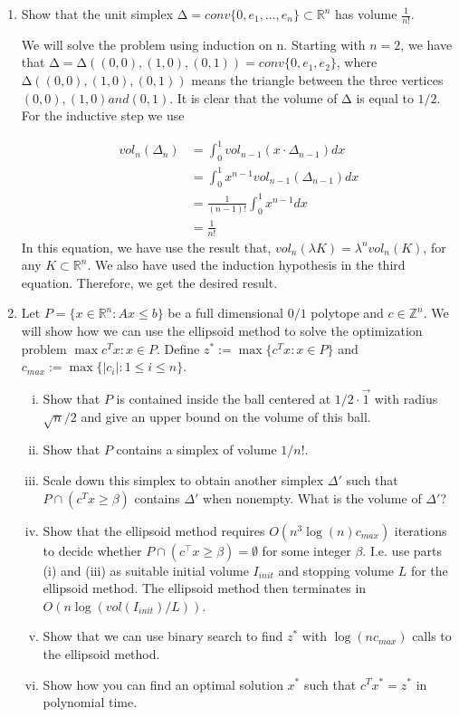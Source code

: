 \documentclass[11pt]{article}
\institute{\'Ecole Polytechnique F\'ed\'erale de Lausanne}
\newcommand{\setR}{\mathbb{R}}
\newcommand{\setZ}{\mathbb{Z}}
\renewcommand{\geq}{\geqslant}
\begin{document}
\makeheader

\begin{enumerate}[1)]

\item Show that the unit simplex $∆ = conv\{0,e_1,\hdots,e_n\}⊂\setR^n$ has volume $\frac{1}{n!}$.


\begin{solution}
We will solve the problem using induction on n. Starting with $n = 2$, we have that $∆ =
∆((0,0),(1,0),(0,1)) = conv \{0,e_1,e_2\}$, where $∆((0,0),(1,0),(0,1))$ means the triangle between
the three vertices $(0,0),(1,0) and (0,1)$. It is clear that the volume of $∆$ is equal to $1/2$.
For the inductive step we use

\begin{align*}
vol_n(\Delta_n) & = \int_0^1 vol_{n-1}(x\cdot \Delta_{n-1}) dx \\
& = \int_0^1 x^{n-1}vol_{n-1}(\Delta_{n-1}) dx \\
& = \frac{1}{(n-1)!}\int_0^1 x^{n-1}dx \\
& = \frac{1}{n!}
\end{align*}
In this equation, we have use the result that, $vol_n(λK) = λ^nvol_n(K)$, for any $K ⊂\setR^n$. We also
have used the induction hypothesis in the third equation. Therefore, we get the desired result.

\end{solution}



\item Let $P= \{x∈\setR^n : Ax≤b\}$ be a full dimensional $0/1$ polytope and $c ∈\setZ^n$. We will show how we
can use the ellipsoid method to solve the optimization problem $\max c^Tx: x∈P$.
Define $z^*:= \max \{c^Tx: x∈P\}$ and $c_{max} := \max \{|c_i|: 1 ≤i≤n\}$.
\begin{enumerate}[i)]
\item Show that $P$ is contained inside the ball centered at $1/2 \cdot \vec{1}$ with radius $\sqrt{n}/2$ and give an upper bound on the volume of this ball. 
\item Show that $P$ contains a simplex of volume $1/n!$.
\item Scale down this simplex to obtain another simplex $\Delta'$ such that $P \cap (c^Tx\geq \beta)$ contains $\Delta'$ when nonempty. What is the volume of $\Delta'$?
\item Show that the ellipsoid method requires $O(n^3 \log(n)c_{max})$ iterations to decide whether $P ∩
(c^⊤x≥β) = ∅$ for some integer $β$. I.e. use parts (i) and (iii) as suitable initial volume $I_{init}$ and stopping volume $L$ for the ellipsoid method. The ellipsoid method then terminates in $O(n \log(vol(I_{init})/L))$. 
\item Show that we can use binary search to find $z^*$ with $\log(nc_{max})$ calls to the ellipsoid method.
\item Show how you can find an optimal solution $x^*$ such that $c^Tx^*= z^*$ in polynomial time.
\end{enumerate}



\end{enumerate}
\end{document}

